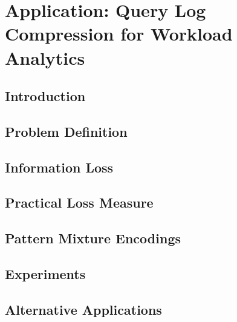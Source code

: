 \chapter{Application: Query Log Compression for Workload Analytics}

\begin{abstract}

\end{abstract}

\section{Introduction}


\section{Problem Definition}
\label{sec:problemdefinition}


\section{Information Loss}
\label{sec:analyzingsummaries}


\section{Practical Loss Measure}
\label{sec:practicalrepresentativeness}


\section{Pattern Mixture Encodings}


\section{Experiments}
\label{sec:experiments}


\section{Alternative Applications}
\label{sec:evaluatingalternativeapplications}


